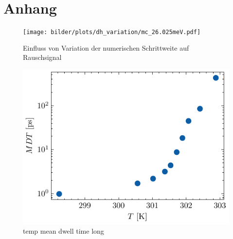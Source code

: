 \documentclass[main.tex]{subfiles}
\begin{document}
\newpage
\section{Anhang}

\begin{figure}[H]
    \centering
    \texttt{[image: bilder/plots/dh\_variation/mc\_26.025meV.pdf]}
    \caption{Einfluss von Variation der numerischen Schrittweite  auf Rauschsignal}\label{fig:dh-variation}
\end{figure}

\begin{figure}[H]
    \centering
    \includegraphics{bilder/plots/temp_comparison_long/mean_dwell_time.pdf}
    \caption{temp mean dwell time long }\label{fig:temp-mdt-long}
\end{figure}
\end{document}
